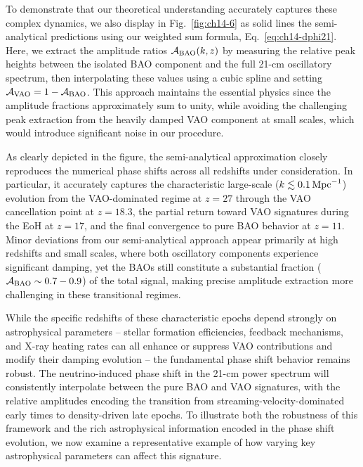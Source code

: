 To demonstrate that our theoretical understanding accurately captures these complex dynamics, we also display in Fig.~\ref{fig:ch14-6} as solid lines the semi-analytical predictions using our weighted sum formula, Eq.~\eqref{eq:ch14-dphi21}. Here, we extract the amplitude ratios $\mathcal{A}_{\rm BAO}(k,z)$ by measuring the relative peak heights between the isolated BAO component and the full 21-cm oscillatory spectrum, then interpolating these values using a cubic spline and setting $\mathcal{A}_{\rm VAO} = 1 - \mathcal{A}_{\rm BAO}$. This approach maintains the essential physics since the amplitude fractions approximately sum to unity, while avoiding the challenging peak extraction from the heavily damped VAO component at small scales, which would introduce significant noise in our procedure.

As clearly depicted in the figure, the semi-analytical approximation closely reproduces the numerical phase shifts across all redshifts under consideration. In particular, it accurately captures the characteristic large-scale ($k\lesssim 0.1\,\rm{Mpc}^{-1}$) evolution from the VAO-dominated regime at $z=27$ through the VAO cancellation point at $z=18.3$, the partial return toward VAO signatures during the EoH at $z=17$, and the final convergence to pure BAO behavior at $z=11$. Minor deviations from our semi-analytical approach appear primarily at high redshifts and small scales, where both oscillatory components experience significant damping, yet the BAOs still constitute a substantial fraction ($\mathcal{A}_{\rm BAO} \sim 0.7-0.9$) of the total signal, making precise amplitude extraction more challenging in these transitional regimes.

While the specific redshifts of these characteristic epochs depend strongly on astrophysical parameters -- stellar formation efficiencies, feedback mechanisms, and X-ray heating rates can all enhance or suppress VAO contributions and modify their damping evolution -- the fundamental phase shift behavior remains robust. The neutrino-induced phase shift in the 21-cm power spectrum will consistently interpolate between the pure BAO and VAO signatures, with the relative amplitudes encoding the transition from streaming-velocity-dominated early times to density-driven late epochs. To illustrate both the robustness of this framework and the rich astrophysical information encoded in the phase shift evolution, we now examine a representative example of how varying key astrophysical parameters can affect this signature.

